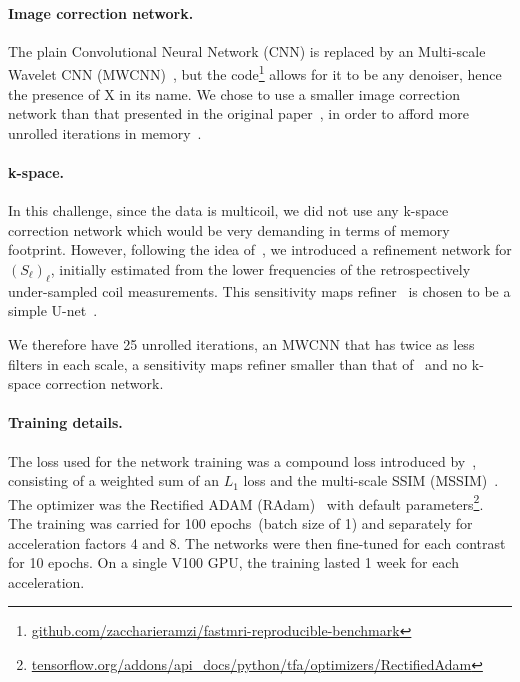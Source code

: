 \documentclass{article}
\begin{document}
\paragraph{Image correction network.} The plain Convolutional Neural Network (CNN) is replaced by an Multi-scale Wavelet CNN (MWCNN)~\cite{Liu}, but the code\footnote{\href{https://github.com/zaccharieramzi/fastmri-reproducible-benchmark}{github.com/zaccharieramzi/fastmri-reproducible-benchmark}} allows for it to be any denoiser, hence the presence of X in its name.
We chose to use a smaller image correction network than that presented in the original paper~\cite{Liu}, in order to afford more unrolled iterations in memory~\cite{Ramzi2020BenchmarkingDatasets}.


\paragraph{k-space.} In this challenge, since the data is multicoil, we did not use any k-space correction network which would be very demanding in terms of memory footprint.
However, following the idea of~\cite{Sriram2020End-to-EndReconstruction}, we introduced a refinement network for $(S_\ell)_\ell$, initially estimated from the lower frequencies of the retrospectively under-sampled coil measurements.
This sensitivity maps refiner~\cite{Sriram2020End-to-EndReconstruction} is chosen to be a simple U-net~\cite{Ronneberger}.

We therefore have 25 unrolled iterations, an MWCNN that has twice as less filters in each scale, a sensitivity maps refiner smaller than that of~\cite{Sriram2020End-to-EndReconstruction} and no k-space correction network.

\paragraph{Training details.} The loss used for the network training was a compound loss introduced by~\cite{Pezzotti2020AnChallenge}, consisting of a weighted sum of an $L_1$ loss and the multi-scale SSIM (MSSIM)~\cite{Wang2004}.
The optimizer was the Rectified ADAM (RAdam)~\cite{Liu2020OnBeyond} with default parameters\footnote{\href{https://www.tensorflow.org/addons/api_docs/python/tfa/optimizers/RectifiedAdam}{tensorflow.org/addons/api\_docs/python/tfa/optimizers/RectifiedAdam}}.
The training was carried for 100 epochs~(batch size of 1) and separately for acceleration factors 4 and 8. 
The networks were then fine-tuned for each contrast for 10 epochs.
On a single V100 GPU, the training lasted 1 week for each acceleration.
\end{document}
